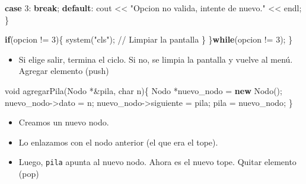 \documentclass[
  11pt,
  a4paper,
  DIV=11,
  numbers=noendperiod]{scrreprt}
\newenvironment{Shaded}{\begin{snugshade}}{\end{snugshade}}
\newcommand{\CommentTok}[1]{\textcolor[rgb]{0.37,0.37,0.37}{#1}}
\newcommand{\ControlFlowTok}[1]{\textcolor[rgb]{0.00,0.23,0.31}{\textbf{#1}}}
\newcommand{\DataTypeTok}[1]{\textcolor[rgb]{0.68,0.00,0.00}{#1}}
\newcommand{\DecValTok}[1]{\textcolor[rgb]{0.68,0.00,0.00}{#1}}
\newcommand{\KeywordTok}[1]{\textcolor[rgb]{0.00,0.23,0.31}{\textbf{#1}}}
\newcommand{\NormalTok}[1]{\textcolor[rgb]{0.00,0.23,0.31}{#1}}
\newcommand{\OperatorTok}[1]{\textcolor[rgb]{0.37,0.37,0.37}{#1}}
\newcommand{\StringTok}[1]{\textcolor[rgb]{0.13,0.47,0.30}{#1}}
\providecommand{\tightlist}{%
  \setlength{\itemsep}{0pt}\setlength{\parskip}{0pt}}
\begin{document}
\begin{Shaded}
\begin{Highlighting}[]
            \ControlFlowTok{case} \DecValTok{3}\OperatorTok{:} \ControlFlowTok{break}\OperatorTok{;}
            \ControlFlowTok{default}\OperatorTok{:}\NormalTok{ cout }\OperatorTok{\textless{}\textless{}} \StringTok{"Opcion no valida, intente de nuevo."} \OperatorTok{\textless{}\textless{}}\NormalTok{ endl}\OperatorTok{;}
        \OperatorTok{\}}

        \ControlFlowTok{if}\OperatorTok{(}\NormalTok{opcion }\OperatorTok{!=} \DecValTok{3}\OperatorTok{)\{}
\NormalTok{            system}\OperatorTok{(}\StringTok{"cls"}\OperatorTok{);} \CommentTok{// Limpiar la pantalla}
        \OperatorTok{\}}
    \OperatorTok{\}}\ControlFlowTok{while}\OperatorTok{(}\NormalTok{opcion }\OperatorTok{!=} \DecValTok{3}\OperatorTok{);}
\OperatorTok{\}}
\end{Highlighting}
\end{Shaded}

\begin{itemize}
\tightlist
\item
  Si elige salir, termina el ciclo. Si no, se limpia la pantalla y
  vuelve al menú. Agregar elemento (push)
\end{itemize}

\begin{Shaded}
\begin{Highlighting}[]
\DataTypeTok{void}\NormalTok{ agregarPila}\OperatorTok{(}\NormalTok{Nodo }\OperatorTok{*\&}\NormalTok{pila}\OperatorTok{,} \DataTypeTok{char}\NormalTok{ n}\OperatorTok{)\{}
\NormalTok{    Nodo }\OperatorTok{*}\NormalTok{nuevo\_nodo }\OperatorTok{=} \KeywordTok{new}\NormalTok{ Nodo}\OperatorTok{();}
\NormalTok{    nuevo\_nodo}\OperatorTok{{-}\textgreater{}}\NormalTok{dato }\OperatorTok{=}\NormalTok{ n}\OperatorTok{;}
\NormalTok{    nuevo\_nodo}\OperatorTok{{-}\textgreater{}}\NormalTok{siguiente }\OperatorTok{=}\NormalTok{ pila}\OperatorTok{;}
\NormalTok{    pila }\OperatorTok{=}\NormalTok{ nuevo\_nodo}\OperatorTok{;}
\OperatorTok{\}}
\end{Highlighting}
\end{Shaded}

\begin{itemize}
\tightlist
\item
  Creamos un nuevo nodo.
\item
  Lo enlazamos con el nodo anterior (el que era el tope).
\item
  Luego, \texttt{pila} apunta al nuevo nodo. Ahora es el nuevo tope.
  Quitar elemento (pop)
\end{itemize}
\end{document}
